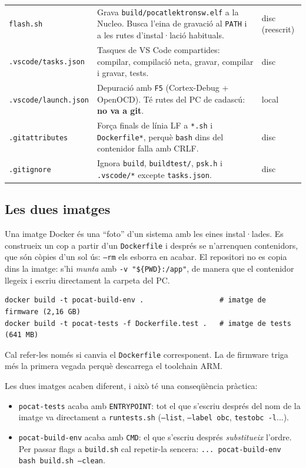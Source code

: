 \documentclass[11pt,a4paper]{article}
\DeclareRobustCommand{\_}{\textunderscore\allowbreak}
\newcommand{\cd}[1]{\texttt{#1}}
\newcommand{\PWD}{\$\{PWD\}}
\begin{document}
\begin{longtable}{@{}>{\raggedright\arraybackslash}p{4.3cm}>{\raggedright\arraybackslash}p{9.6cm}>{\raggedright\arraybackslash}p{2.6cm}@{}}
\cd{flash.sh} & Grava \cd{build/pocat\_lektron\_sw.elf} a la Nucleo. Busca l'eina de gravació al \cd{PATH} i a
  les rutes d'instal·lació habituals. & disc (reescrit)\\
\cd{.vscode/tasks.json} & Tasques de VS Code compartides: compilar, compilació neta, gravar, compilar i gravar, tests. & disc\\
\cd{.vscode/launch.json} & Depuració amb \cd{F5} (Cortex-Debug + OpenOCD). Té rutes del PC de cadascú: \textbf{no va a git}. & local\\
\cd{.gitattributes} & Força finals de línia LF a \cd{*.sh} i \cd{Dockerfile*}, perquè \cd{bash} dins del contenidor falla amb CRLF. & disc\\
\cd{.gitignore} & Ignora \cd{build}, \cd{build\_test/}, \cd{psk.h} i \cd{.vscode/*} excepte \cd{tasks.json}. & disc\\
\end{longtable}
\endgroup

\subsection{Les dues imatges}

Una imatge Docker és una ``foto'' d'un sistema amb les eines instal·lades. Es construeix
un cop a partir d'un \cd{Dockerfile} i després se n'arrenquen contenidors, que són còpies
d'un sol ús: \cd{--rm} els esborra en acabar. El repositori no es copia dins la imatge:
s'hi \emph{munta} amb \cd{-v "\PWD:/app"}, de manera que el contenidor llegeix i escriu
directament la carpeta del PC.

\begin{lstlisting}
docker build -t pocat-build-env .                  # imatge de firmware (2,16 GB)
docker build -t pocat-tests -f Dockerfile.test .   # imatge de tests (641 MB)
\end{lstlisting}

Cal refer-les només si canvia el \cd{Dockerfile} corresponent. La de firmware triga
més la primera vegada perquè descarrega el toolchain ARM.

Les dues imatges acaben diferent, i això té una conseqüència pràctica:
\begin{itemize}
\item \cd{pocat-tests} acaba amb \cd{ENTRYPOINT}: tot el que s'escriu després del nom de
  la imatge va directament a \cd{run\_tests.sh} (\cd{--list}, \cd{--label obc}, \cd{test\_obc -l}...).
\item \cd{pocat-build-env} acaba amb \cd{CMD}: el que s'escriu després \emph{substitueix}
  l'ordre. Per passar flags a \cd{build.sh} cal repetir-la sencera:
  \cd{... pocat-build-env bash build.sh --clean}.
\end{itemize}
\end{document}
